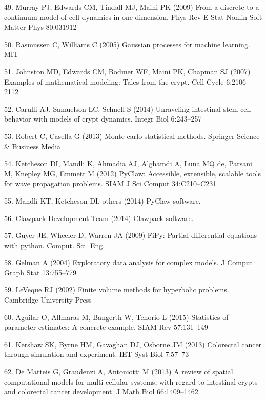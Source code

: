 \documentclass[10pt,letterpaper]{article}
\begin{document}
\hypertarget{ref-Murray2009-zg}{}
49. Murray PJ, Edwards CM, Tindall MJ, Maini PK (2009) From a discrete
to a continuum model of cell dynamics in one dimension. Phys Rev E Stat
Nonlin Soft Matter Phys 80:031912

\hypertarget{ref-Rasmussen2005-ef}{}
50. Rasmussen C, Williams C (2005) Gaussian processes for machine
learning. MIT

\hypertarget{ref-Johnston2007-pq}{}
51. Johnston MD, Edwards CM, Bodmer WF, Maini PK, Chapman SJ (2007)
Examples of mathematical modeling: Tales from the crypt. Cell Cycle
6:2106--2112

\hypertarget{ref-Carulli2014-bd}{}
52. Carulli AJ, Samuelson LC, Schnell S (2014) Unraveling intestinal
stem cell behavior with models of crypt dynamics. Integr Biol 6:243--257

\hypertarget{ref-Robert2013-gx}{}
53. Robert C, Casella G (2013) Monte carlo statistical methods. Springer
Science \& Business Media

\hypertarget{ref-Ketcheson2012-od}{}
54. Ketcheson DI, Mandli K, Ahmadia AJ, Alghamdi A, Luna MQ de, Parsani
M, Knepley MG, Emmett M (2012) PyClaw: Accessible, extensible, scalable
tools for wave propagation problems. SIAM J Sci Comput 34:C210--C231

\hypertarget{ref-Pyclaw2014-py}{}
55. Mandli KT, Ketcheson DI, others (2014) PyClaw software.

\hypertarget{ref-Clawpack2014-cs}{}
56. Clawpack Development Team (2014) Clawpack software.

\hypertarget{ref-Guyer2009-sq}{}
57. Guyer JE, Wheeler D, Warren JA (2009) FiPy: Partial differential
equations with python. Comput. Sci. Eng.

\hypertarget{ref-Gelman2004-bk}{}
58. Gelman A (2004) Exploratory data analysis for complex models. J
Comput Graph Stat 13:755--779

\hypertarget{ref-LeVeque2002-eq}{}
59. LeVeque RJ (2002) Finite volume methods for hyperbolic problems.
Cambridge University Press

\hypertarget{ref-Aguilar2015-um}{}
60. Aguilar O, Allmaras M, Bangerth W, Tenorio L (2015) Statistics of
parameter estimates: A concrete example. SIAM Rev 57:131--149

\hypertarget{ref-Kershaw2013-jb}{}
61. Kershaw SK, Byrne HM, Gavaghan DJ, Osborne JM (2013) Colorectal
cancer through simulation and experiment. IET Syst Biol 7:57--73

\hypertarget{ref-De_Matteis2013-zo}{}
62. De Matteis G, Graudenzi A, Antoniotti M (2013) A review of spatial
computational models for multi-cellular systems, with regard to
intestinal crypts and colorectal cancer development. J Math Biol
66:1409--1462
\end{document}
